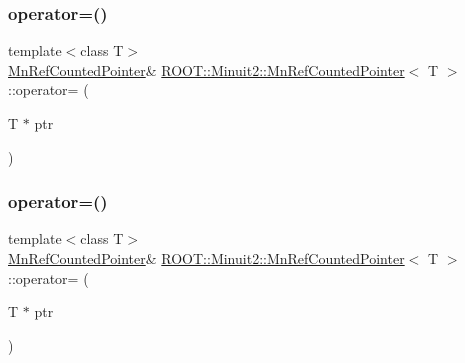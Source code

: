 \subsubsection{\texorpdfstring{operator=()}{operator=()}\hspace{0.1cm}{\footnotesize\ttfamily [3/4]}}
{\footnotesize\ttfamily template$<$class T$>$ \\
\mbox{\hyperlink{classROOT_1_1Minuit2_1_1MnRefCountedPointer}{Mn\+Ref\+Counted\+Pointer}}\& \mbox{\hyperlink{classROOT_1_1Minuit2_1_1MnRefCountedPointer}{R\+O\+O\+T\+::\+Minuit2\+::\+Mn\+Ref\+Counted\+Pointer}}$<$ T $>$\+::operator= (\begin{DoxyParamCaption}\item[{T $\ast$}]{ptr }\end{DoxyParamCaption})\hspace{0.3cm}{\ttfamily [inline]}}

\mbox{\label{classROOT_1_1Minuit2_1_1MnRefCountedPointer_a6867125c7f9d76199e7a6676eed5f682}} 
\subsubsection{\texorpdfstring{operator=()}{operator=()}\hspace{0.1cm}{\footnotesize\ttfamily [4/4]}}
{\footnotesize\ttfamily template$<$class T$>$ \\
\mbox{\hyperlink{classROOT_1_1Minuit2_1_1MnRefCountedPointer}{Mn\+Ref\+Counted\+Pointer}}\& \mbox{\hyperlink{classROOT_1_1Minuit2_1_1MnRefCountedPointer}{R\+O\+O\+T\+::\+Minuit2\+::\+Mn\+Ref\+Counted\+Pointer}}$<$ T $>$\+::operator= (\begin{DoxyParamCaption}\item[{T $\ast$}]{ptr }\end{DoxyParamCaption})\hspace{0.3cm}{\ttfamily [inline]}}

\mbox{\label{classROOT_1_1Minuit2_1_1MnRefCountedPointer_a2dbec0c22ef3492abc24cdaa885fd26e}} 
